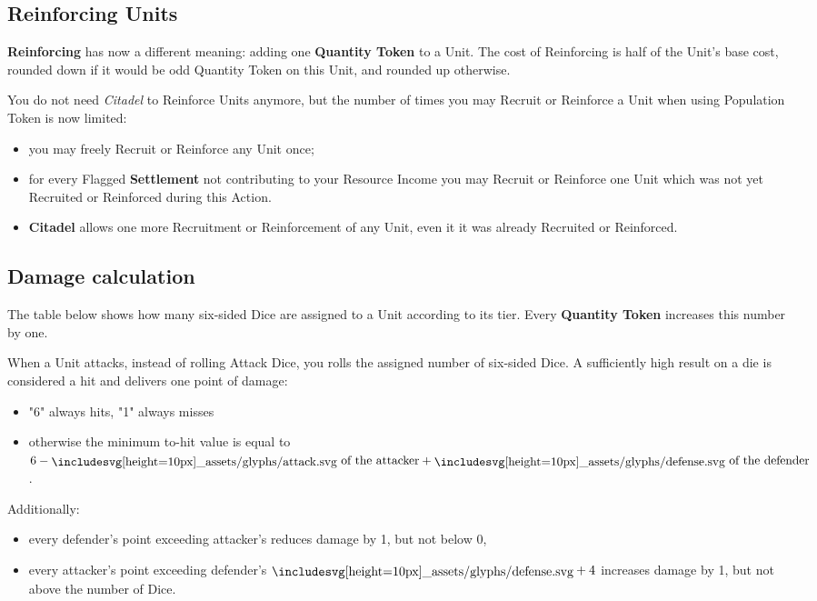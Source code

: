 \begin{multicols*}{2}
    \subsection*{Reinforcing Units}
    
    \textbf{Reinforcing} has now a different meaning: adding one \textbf{Quantity Token} to a Unit. The cost of Reinforcing is half of the Unit's base  cost, rounded down if it would be odd Quantity Token on this Unit, and rounded up otherwise.
    
    \medskip
    
    
    You do not need \textit{Citadel} to Reinforce Units anymore, but the number of times you may Recruit or Reinforce a Unit when using Population Token is now limited:
    \begin{itemize}
        \item you may freely Recruit or Reinforce any Unit once;
        \item for every Flagged \textbf{Settlement} not contributing to your Resource Income you may Recruit or Reinforce one Unit which was not yet Recruited or Reinforced during this Action.
        \item \textbf{Citadel} allows one more Recruitment or Reinforcement of any Unit, even it it was already Recruited or Reinforced.
    \end{itemize}
    
    \subsection*{Damage calculation}
    
    The table below shows how many six-sided Dice are assigned to a Unit according to its tier. Every \textbf{Quantity Token} increases this number by one.
    
    When a Unit attacks, instead of rolling Attack Dice, you rolls the assigned number of six-sided Dice. A sufficiently high result on a die is considered a hit and delivers one point of damage:
    \begin{itemize}
        \item "6" always hits, "1" always misses
        \item otherwise the minimum to-hit value is equal to $6 - \svg{attack} \text{ of the attacker} + \svg{defense} \text{ of the defender}$.
    \end{itemize}
    Additionally:
    \begin{itemize}
        \item every defender's  point exceeding attacker's  reduces damage by 1, but not below 0,
        \item every attacker's  point exceeding defender's $\svg{defense} + 4$ increases damage by 1, but not above the number of Dice.
    \end{itemize}
    

\end{multicols*}
